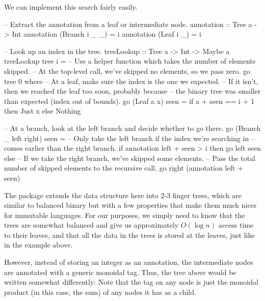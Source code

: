 We can implement this search fairly easily.
\begin{haskell}
-- Extract the annotation from a leaf or intermediate node.
annotation :: Tree a -> Int
annotation (Branch i _ _) = i
annotation (Leaf i _) = i

-- Look up an index in the tree.
treeLookup :: Tree a -> Int -> Maybe a
treeLookup tree i = 
  -- Use a helper function which takes the number of elements skipped.
  -- At the top-level call, we've skipped no elements, so we pass zero.
  go tree 0
  where
    -- At a leaf, make sure the index is the one we expected.
    -- If it isn't, then we reached the leaf too soon, probably because
    -- the binary tree was smaller than expected (index out of bounds).
    go (Leaf a x) seen =
      if a + seen == i + 1
      then Just x
      else Nothing

    -- At a branch, look at the left branch and decide whether to go there.
    go (Branch _ left right) seen =
      -- Only take the left branch if the index we're searching in
      -- comes earlier than the right branch.
      if annotation left + seen > i
      then go left seen
      else 
        -- If we take the right branch, we've skipped some elements.
        -- Pass the total number of skipped elements to the recursive call.
        go right (annotation left + seen)
\end{haskell}


The  package extends the data structure here into 2-3 finger trees, which are
similar to balanced binary but with a few properties that make them much nicer for immutable
languages. For our purposes, we simply need to know that the trees are somewhat balanced and give us
approximately $O(\log n)$ access time to their leaves, and that all the data in the trees is stored
at the leaves, just like in the example above.

However, instead of storing an integer as an annotation, the intermediate nodes are annotated with a
generic monoidal tag. Thus, the tree above would be written somewhat differently:
Note that the tag on any node is just the monoidal product (in this case, the sum) of any nodes it
has as a child.


